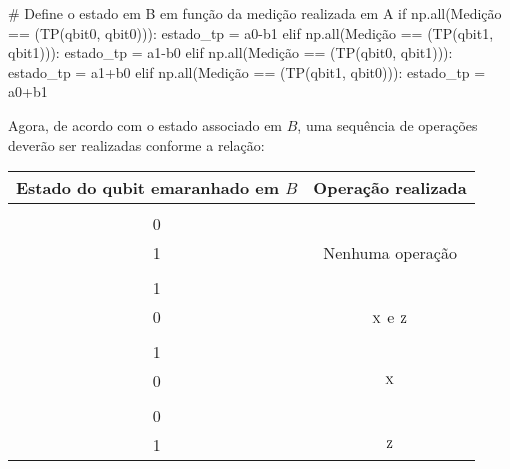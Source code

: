 \begin{pycode}
    # Define o estado em B em função da medição realizada em A
    if np.all(Medição == (TP(qbit0, qbit0))):
        estado_tp = a0-b1
    elif np.all(Medição == (TP(qbit1, qbit1))):
        estado_tp = a1-b0
    elif np.all(Medição == (TP(qbit0, qbit1))):
        estado_tp = a1+b0
    elif np.all(Medição == (TP(qbit1, qbit0))):
        estado_tp = a0+b1
\end{pycode}

Agora, de acordo com o estado associado em \(B\), uma sequência de operações deverão ser realizadas conforme a relação:
\begin{center}
  \begin{tabular}{cc}
    \toprule
    Estado do qubit emaranhado em \(B\) & Operação realizada \\
    \midrule
    \(\alpha \begin{bmatrix} 1 \\ 0 \end{bmatrix} + \beta \begin{bmatrix} 0 \\ 1 \end{bmatrix}\) & Nenhuma operação \\
    \(\alpha \begin{bmatrix} 0 \\ 1 \end{bmatrix} - \beta \begin{bmatrix} 1 \\ 0 \end{bmatrix}\) & \(\operatorname{\textsc{x}}\) e \(\operatorname{\textsc{z}}\) \\
    \(\alpha \begin{bmatrix} 0 \\ 1 \end{bmatrix} + \beta \begin{bmatrix} 1 \\ 0 \end{bmatrix}\) & \(\operatorname{\textsc{x}}\) \\
    \(\alpha \begin{bmatrix} 1 \\ 0 \end{bmatrix} - \beta \begin{bmatrix} 0 \\ 1 \end{bmatrix}\) & \(\operatorname{\textsc{z}}\) \\
    \bottomrule
  \end{tabular}
\end{center}

